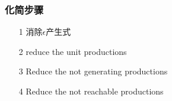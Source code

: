 \documentclass[12pt]{ctexart}
\theoremstyle{definition}
\theoremstyle{definition}
\theoremstyle{plain}
\theoremstyle{remark}
\begin{document}
\subsubsection{化简步骤}

\begin{enumerate}
\item [1]  消除\(\epsilon\)产生式
\item [2]  reduce the unit productions
\item [3] Reduce the not generating productions
\item [4] Reduce the not reachable productions
\end{enumerate}

\end{document}

